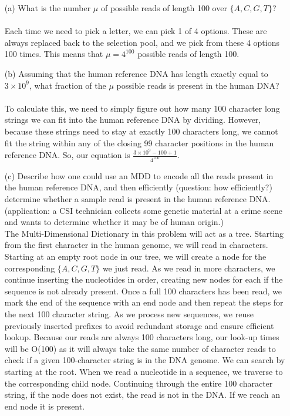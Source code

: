 \documentclass[12pt]{article}
\begin{document}
\begin{enumerate}
    \item[(a)] What is the number \( \mu \) of possible reads of length 100 over \( \{ A, C, G, T \} \)? \\
    \\
    Each time we need to pick a letter, we can pick 1 of 4 options. These are always replaced back to the selection pool, and we pick from these 4 options 100 times. This means that $\mu = 4^{100}$ possible reads of length 100. 

    \item[(b)] Assuming that the human reference DNA has length exactly equal to \( 3 \times 10^9 \), what fraction of the \( \mu \) possible reads is present in the human DNA? \\
    \\
    To calculate this, we need to simply figure out how many 100 character long strings we can fit into the human reference DNA by dividing. However, because these strings need to stay at exactly 100 characters long, we cannot fit the string within any of the closing 99 character positions in the human reference DNA. So, our equation is $\frac{3 \times 10^9 - 100 + 1}{4^{100}}$. 

    \pagebreak

    \item[(c)] Describe how one could use an MDD to encode all the reads present in the human reference DNA, and then efficiently (question: how efficiently?) determine whether a sample read is present in the human reference DNA. (application: a CSI technician collects some genetic material at a crime scene and wants to determine whether it may be of human origin.)
    \\
    

    The Multi-Dimensional Dictionary in this problem will act as a tree. Starting from the first character in the human genome, we will read in characters. Starting at an empty root node in our tree, we will create a node for the corresponding ${\{A,C,G,T\}}$ we just read. As we read in more characters, we continue inserting the nucleotides in order, creating new nodes for each if the sequence is not already present. Once a full 100 characters has been read, we mark the end of the sequence with an end node and then repeat the steps for the next 100 character string. As we process new sequences, we reuse previously inserted prefixes to avoid redundant storage and ensure efficient lookup. Because our reads are always 100 characters long, our look-up times will be O(100) as it will always take the same number of character reads to check if a given 100-character string is in the DNA genome. We can search by starting at the root. When we read a nucleotide in a sequence, we traverse to the corresponding child node. Continuing through the entire 100 character string, if the node does not exist, the read is not in the DNA. If we reach an end node it is present. 

\end{enumerate}
\end{document}
